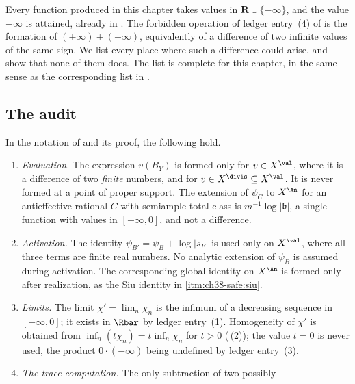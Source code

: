 Every function produced in this chapter takes values in
$\mathbf R\cup\{-\infty\}$, and the value $-\infty$ is attained,
already in .  The forbidden
operation of ledger entry~(4) of  is the
formation of $(+\infty)+(-\infty)$, equivalently of a difference of two
infinite values of the same sign.  We list every place where such a
difference could arise, and show that none of them does.  The list is
complete for this chapter, in the same sense as the corresponding list in
.

\subsection{The audit}
\label{sec:ch38-audit}

\begin{proposition}
\label{prop:ch38-safeguards}
In the notation of  and its proof,
the following hold.
\begin{enumerate}
\item\label{itm:ch38-safe:eval}
 \emph{Evaluation.}  The expression $v(B_Y)$ is formed only for
 $v\in X^{\val}$, where it is a difference of two \emph{finite}
 numbers, and for $v\in X^{\divis}\subseteq X^{\val}$.  It is never
 formed at a point of proper support.  The extension of
 $\psi_C$ to $X^{\An}$ for an antieffective rational $C$ with
 semiample total class is $m^{-1}\log|\mathfrak b|$, a single function
 with values in $[-\infty,0]$, and not a difference.
\item\label{itm:ch38-safe:activation}
 \emph{Activation.}  The identity
 $\psi_{B'}=\psi_B+\log|s_F|$ is used only on $X^{\val}$, where all
 three terms are finite real numbers.  No analytic extension of $\psi_B$
 is assumed during activation.  The corresponding global identity on
 $X^{\An}$ is formed only after realization, as the Siu identity in
 \cref{itm:ch38-safe:siu}.
\item\label{itm:ch38-safe:limit}
 \emph{Limits.}  The limit $\chi'=\lim_n\chi_n$ is the infimum of a
 decreasing sequence in $[-\infty,0]$; it exists in $\Rbar$ by ledger
 entry~(1).  Homogeneity of $\chi'$ is obtained from
 $\inf_n(t\chi_n)=t\inf_n\chi_n$ for $t>0$
 (\,(2)); the value $t=0$ is never used,
 the product $0\cdot(-\infty)$ being undefined by ledger entry~(3).
\item\label{itm:ch38-safe:trace}
 \emph{The trace computation.}  The only subtraction of two possibly

\end{enumerate}
\end{proposition}
